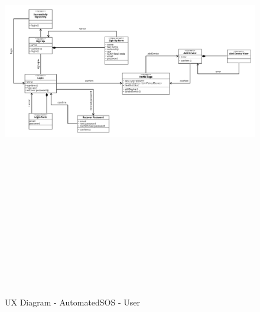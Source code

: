  \begin{figure}[H]
    \includegraphics[width=\linewidth, height = 20cm, keepaspectratio]{./Images/DD_UXD_ASOS.png}
    \centering
    \caption{UX Diagram - AutomatedSOS - User}
    \label{fig:sab}
 \end{figure}

